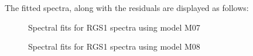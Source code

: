 			The fitted spectra, along with the residuals are displayed as follows:
			\begin{figure}[h!]
				\centering
				\caption{Spectral fits for RGS1 spectra using model M07}
				\label{xmm:rgs1-m07}
			\end{figure}
			\begin{figure}[h!]
				\centering
				\caption{Spectral fits for RGS1 spectra using model M08}
				\label{xmm:rgs1-m08}
			\end{figure}
